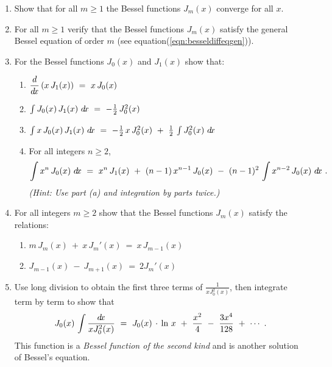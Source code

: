 {\begin{enumerate}[\bfseries 1.]
 \item Show that for all $m \ge 1$ the Bessel functions $J_m(x)$ converge for
  all $x$.
 \item For all $m \ge 1$ verify that the Bessel functions $J_m(x)$ satisfy the
  general Bessel equation of order $m$
  (see equation(\ref{eqn:besseldiffeqgen})).
 \item\label{exer:besselderiv} For the Bessel functions $J_0(x)$ and $J_1(x)$
  show that:
\begin{enumerate}[\bfseries (a)]
\item $\dfrac{d}{d\!x}\,(x\,J_1(x)) ~=~ x\,J_0(x)$
\item $\int J_0(x)\,J_1(x)~d\!x ~=~ -\frac{1}{2}\,J_0^2(x)$
\item $\int x\,J_0(x)\,J_1(x)~d\!x ~=~ -\frac{1}{2}\,x\,J_0^2(x) ~+~
\frac{1}{2}\,\int J_0^2(x)~d\!x$
\item For all integers $n\ge 2$,
\[
\int x^n\,J_0(x)~d\!x ~=~ x^n\,J_1(x) ~+~ (n-1)\,x^{n-1}\,J_0(x) ~-~
(n-1)^2\,\int x^{n-2}\,J_0(x)~d\!x ~.
\]
\emph{(Hint: Use part (a) and integration by parts twice.)}
\end{enumerate}
 \item For all integers $m\ge 2$ show that the Bessel functions $J_m(x)$
  satisfy the relations:
\begin{enumerate}[\bfseries (a)]
\item $m\,J_m(x) ~+~ x\,J_m'(x) ~=~ x\,J_{m-1}(x)$
\item $J_{m-1}(x) ~-~ J_{m+1}(x) ~=~ 2J_{m}'(x)$
\end{enumerate}
 \item Use long division to obtain the first three terms of
  $\frac{1}{x J_0^2(x)}$, then integrate term by term to show that
\[
J_0(x)\,\int \frac{d\!x}{x J_0^2(x)} ~=~ J_0(x)\,\cdot\,\ln\,x ~+~ \frac{x^2}{4}
~-~ \frac{3x^4}{128} ~+~ \cdots ~.
\]
This function is a \emph{Bessel function of the second kind} and is another
solution of Bessel's equation.
\end{enumerate}
}
\newpage
